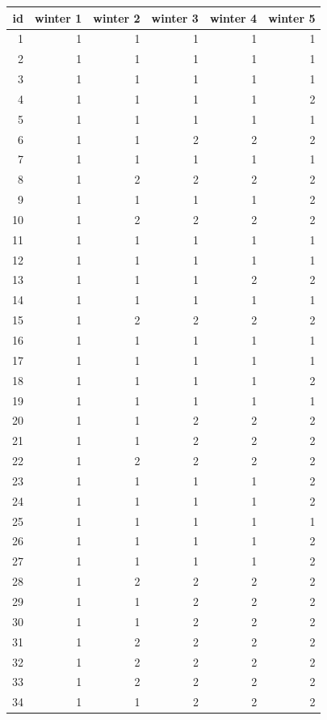 \documentclass[
  12pt,
]{krantz}
\begin{document}
\begin{tabular}{r|r|r|r|r|r}
\hline
id & winter 1 & winter 2 & winter 3 & winter 4 & winter 5\\
\hline
1 & 1 & 1 & 1 & 1 & 1\\
\hline
2 & 1 & 1 & 1 & 1 & 1\\
\hline
3 & 1 & 1 & 1 & 1 & 1\\
\hline
4 & 1 & 1 & 1 & 1 & 2\\
\hline
5 & 1 & 1 & 1 & 1 & 1\\
\hline
6 & 1 & 1 & 2 & 2 & 2\\
\hline
7 & 1 & 1 & 1 & 1 & 1\\
\hline
8 & 1 & 2 & 2 & 2 & 2\\
\hline
9 & 1 & 1 & 1 & 1 & 2\\
\hline
10 & 1 & 2 & 2 & 2 & 2\\
\hline
11 & 1 & 1 & 1 & 1 & 1\\
\hline
12 & 1 & 1 & 1 & 1 & 1\\
\hline
13 & 1 & 1 & 1 & 2 & 2\\
\hline
14 & 1 & 1 & 1 & 1 & 1\\
\hline
15 & 1 & 2 & 2 & 2 & 2\\
\hline
16 & 1 & 1 & 1 & 1 & 1\\
\hline
17 & 1 & 1 & 1 & 1 & 1\\
\hline
18 & 1 & 1 & 1 & 1 & 2\\
\hline
19 & 1 & 1 & 1 & 1 & 1\\
\hline
20 & 1 & 1 & 2 & 2 & 2\\
\hline
21 & 1 & 1 & 2 & 2 & 2\\
\hline
22 & 1 & 2 & 2 & 2 & 2\\
\hline
23 & 1 & 1 & 1 & 1 & 2\\
\hline
24 & 1 & 1 & 1 & 1 & 2\\
\hline
25 & 1 & 1 & 1 & 1 & 1\\
\hline
26 & 1 & 1 & 1 & 1 & 2\\
\hline
27 & 1 & 1 & 1 & 1 & 2\\
\hline
28 & 1 & 2 & 2 & 2 & 2\\
\hline
29 & 1 & 1 & 2 & 2 & 2\\
\hline
30 & 1 & 1 & 2 & 2 & 2\\
\hline
31 & 1 & 2 & 2 & 2 & 2\\
\hline
32 & 1 & 2 & 2 & 2 & 2\\
\hline
33 & 1 & 2 & 2 & 2 & 2\\
\hline
34 & 1 & 1 & 2 & 2 & 2\\

\end{tabular}
\end{document}
